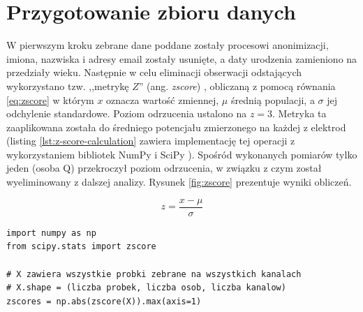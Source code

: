 \documentclass{./assets/wfis}
\begin{document}

\section{Przygotowanie zbioru danych}\label{data-preparation}

W pierwszym kroku zebrane dane poddane zostały procesowi anonimizacji, imiona, nazwiska i adresy email zostały usunięte, a
daty urodzenia zamieniono na przedziały wieku. Następnie w celu eliminacji obserwacji odstających wykorzystano tzw. ,,metrykę $Z$'' (ang. \textit{zscore}) \cite{noauthor_scipystatszscore_nodate}, obliczaną z pomocą równania \ref{eq:zscore} w którym $x$ oznacza wartość zmiennej, $\mu$ średnią populacji, a $\sigma$ jej odchylenie standardowe. Poziom odrzucenia ustalono na $z=3$. Metryka ta zaaplikowana została do średniego potencjału zmierzonego na każdej z elektrod (listing \ref{lst:z-score-calculation} zawiera implementację tej operacji z wykorzystaniem bibliotek NumPy \cite{harris_array_2020} i SciPy \cite{virtanen_scipy_2020}). Spośród wykonanych pomiarów tylko jeden (osoba Q) przekroczył poziom odrzucenia, w związku z czym został wyeliminowany z dalszej analizy. Rysunek \ref{fig:zscore} prezentuje wyniki obliczeń.

\begin{equation}
    z = \frac{x - \mu}{\sigma}
\end{equation}\label{eq:zscore}

\begin{lstlisting}[caption={Obliczanie standardyzacji Z},label={lst:z-score-calculation}]
import numpy as np
from scipy.stats import zscore

# X zawiera wszystkie probki zebrane na wszystkich kanalach
# X.shape = (liczba probek, liczba osob, liczba kanalow)
zscores = np.abs(zscore(X)).max(axis=1)
\end{lstlisting}
\end{document}

